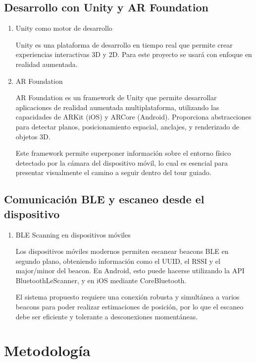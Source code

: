 \documentclass{article}
\begin{document}
\subsection{Desarrollo con Unity y AR Foundation}
\begin{enumerate}[label=\thesubsection.\arabic*]
    \item Unity como motor de desarrollo
    
    Unity es una plataforma de desarrollo en tiempo real que permite crear experiencias interactivas 3D y 2D. Para este proyecto se usará con enfoque en realidad aumentada.

    \item AR Foundation
    
    AR Foundation es un framework de Unity que permite desarrollar aplicaciones de realidad aumentada multiplataforma, utilizando las capacidades de ARKit (iOS) y ARCore (Android). Proporciona abstracciones para detectar planos, posicionamiento espacial, anclajes, y renderizado de objetos 3D.

    Este framework permite superponer información sobre el entorno físico detectado por la cámara del dispositivo móvil, lo cual es esencial para presentar visualmente el camino a seguir dentro del tour guiado.

\end{enumerate}

\subsection{Comunicación BLE y escaneo desde el dispositivo}
\begin{enumerate}[label=\thesubsection.\arabic*]
    \item BLE Scanning en dispositivos móviles
    
    Los dispositivos móviles modernos permiten escanear beacons BLE en segundo plano, obteniendo información como el UUID, el RSSI y el major/minor del beacon.
    En Android, esto puede hacerse utilizando la API BluetoothLeScanner, y en iOS mediante CoreBluetooth.

    El sistema propuesto requiere una conexión robusta y simultánea a varios beacons para poder realizar estimaciones de posición, por lo que el escaneo debe ser eficiente y tolerante a desconexiones momentáneas.
\end{enumerate}


\section{Metodología}
\end{document}
